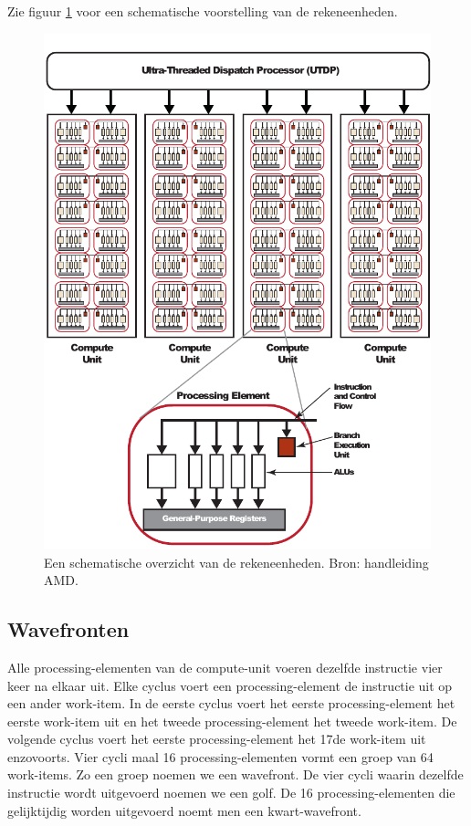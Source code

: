 Zie figuur \ref{alu} voor een schematische voorstelling van de rekeneenheden.

\begin{figure}[h]
\centering
\includegraphics{alu}
\caption{\label{alu}Een schematische overzicht van de rekeneenheden. Bron: handleiding AMD\cite[p.~1-5]{amd}.}
\end{figure}




\subsection{Wavefronten}
\label{wavefront}
Alle processing-elementen van de compute-unit voeren dezelfde instructie vier keer na elkaar uit. Elke cyclus voert een processing-element de instructie uit op een ander work-item. In de eerste cyclus voert het eerste processing-element het eerste work-item uit en het tweede processing-element het tweede work-item. De volgende cyclus voert het eerste processing-element het 17de work-item uit enzovoorts. Vier cycli maal 16 processing-elementen vormt een groep van 64 work-items. Zo een groep noemen we een wavefront. De vier cycli waarin dezelfde instructie wordt uitgevoerd noemen we een golf. De 16 processing-elementen die gelijktijdig worden uitgevoerd noemt men een kwart-wavefront.

